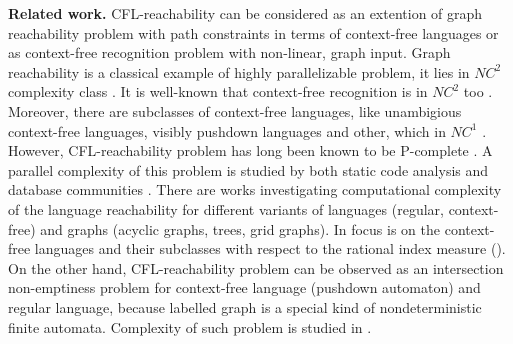 \documentclass[smallextended]{svjour3}       %
\begin{document}
\textbf{Related work.}
CFL-reachability can be considered as an extention of graph reachability problem with path constraints in terms of context-free languages or as context-free recognition problem with non-linear, graph input. Graph reachability is a classical example of highly parallelizable
problem, it lies in $NC^2$ complexity class \cite{Hirschberg}. It is well-known that context-free recognition is in $NC^2$ too \cite*{Brent, Rytter}. Moreover, there are subclasses of context-free languages, like unambigious context-free languages,  visibly pushdown languages and other, which in $NC^1$ \cite*{IBARRA, IBARRA2, Rossmanith, Okhotin2014ComplexityOI}.
\\
However, CFL-reachability problem has long been known to be P-complete \cite{PCompl}. A parallel complexity of this problem is studied by both static code analysis \cite*{RepsBasic, RepSeq} and database communities \cite*{ChainQ, Yannakakis, Ullman}. 
There are works investigating computational complexity of the language reachability for different variants of languages (regular, context-free) and graphs (acyclic graphs, trees, grid graphs)\cite*{Barrett, LReach, LabelledGraphs}. In \cite{Regularrealizability} focus is on the context-free languages and their subclasses with respect to the rational index measure (\cite{RatBasic}). 
\\
On the other hand, CFL-reachability problem can be observed as an intersection non-emptiness problem for context-free language (pushdown automaton) and regular language, because labelled graph is a special kind of nondeterministic finite automata. Complexity of such problem is studied in \cite*{Intersection, VyalyiRR, ganardi2016circuit}.
\end{document}
